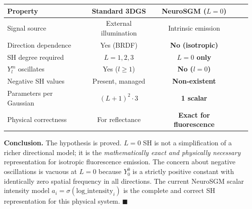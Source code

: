 \documentclass[12pt, a4paper]{article}
\theoremstyle{definition}
\theoremstyle{plain}
\theoremstyle{remark}
\begin{document}
\begin{center}
\renewcommand{\arraystretch}{1.4}
\begin{tabular}{lcccc}
\toprule
\textbf{Property} & \textbf{Standard 3DGS} & \textbf{NeuroSGM ($L=0$)} \\
\midrule
Signal source           & External illumination   & Intrinsic emission \\
Direction dependence    & Yes (BRDF)              & \textbf{No (isotropic)} \\
SH degree required      & $L=1,2,3$               & \textbf{$L=0$ only} \\
$Y_l^m$ oscillates      & Yes ($l\geq 1$)         & \textbf{No ($l=0$)} \\
Negative SH values      & Present, managed        & \textbf{Non-existent} \\
Parameters per Gaussian & $(L+1)^2 \cdot 3$       & \textbf{1 scalar} \\
Physical correctness    & For reflectance         & \textbf{Exact for fluorescence} \\
\bottomrule
\end{tabular}
\end{center}

\bigskip
\noindent
\textbf{Conclusion.}\quad
The hypothesis is proved.  $L=0$ SH is not a simplification of a
richer directional model; it is the \emph{mathematically exact and
physically necessary} representation for isotropic fluorescence
emission.  The concern about negative oscillations is vacuous at
$L=0$ because $Y_0^0$ is a strictly positive constant with identically
zero spatial frequency in all directions.  The current NeuroSGM scalar
intensity model $a_i=\sigma(\mathrm{log\_intensity}_i)$ is the
complete and correct SH representation for this physical system.
\hfill$\blacksquare$
\end{document}
